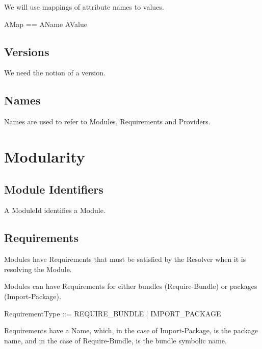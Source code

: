 \documentclass[a4paper,9pt]{article}
\begin{document}
We will use mappings of attribute names to values.

\begin{zed}
 AMap == AName \pfun AValue
\end{zed}

\subsection*{Versions}
We need the notion of a version.
\begin{zed}
 [Version]
\end{zed}

\subsection*{Names}
Names are used to refer to Modules, Requirements and Providers.

\begin{zed}
 [Name]
\end{zed}


\clearpage
\section{Modularity}
\label{cha:modularity}

\subsection*{Module Identifiers}
A ModuleId identifies a Module.

\begin{zed}
 [ModuleId]
\end{zed}

\subsection*{Requirements}
Modules have Requirements that must be satisfied by the Resolver when it is resolving the Module.

Modules can have Requirements for either bundles (Require-Bundle) or packages (Import-Package).

\begin{zed}
 RequirementType ::= REQUIRE\_BUNDLE | IMPORT\_PACKAGE \\
\end{zed}

Requirements have a Name, which, in the case of Import-Package, is the package name, and in the case of Require-Bundle, is the bundle symbolic name.
\end{document}
